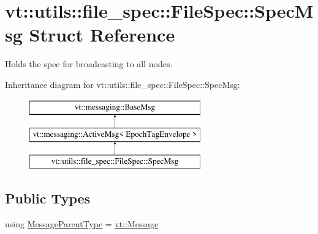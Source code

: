 \hypertarget{structvt_1_1utils_1_1file__spec_1_1_file_spec_1_1_spec_msg}{}\section{vt\+:\+:utils\+:\+:file\+\_\+spec\+:\+:File\+Spec\+:\+:Spec\+Msg Struct Reference}
\label{structvt_1_1utils_1_1file__spec_1_1_file_spec_1_1_spec_msg}


Holds the spec for broadcasting to all nodes.  


Inheritance diagram for vt\+:\+:utils\+:\+:file\+\_\+spec\+:\+:File\+Spec\+:\+:Spec\+Msg\+:\begin{figure}[H]
\begin{center}
\leavevmode
\includegraphics[height=3.000000cm]{structvt_1_1utils_1_1file__spec_1_1_file_spec_1_1_spec_msg}
\end{center}
\end{figure}
\subsection*{Public Types}
\begin{DoxyCompactItemize}
\item 
using \hyperlink{structvt_1_1utils_1_1file__spec_1_1_file_spec_1_1_spec_msg_a9d332512ab77ec1367bec828e687df14}{Message\+Parent\+Type} = \hyperlink{namespacevt_a3a3ddfef40b4c90915fa43cdd5f129ea}{vt\+::\+Message}
\end{DoxyCompactItemize}
